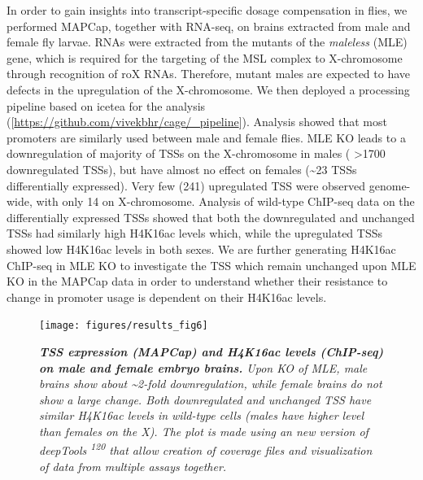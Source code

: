 \documentclass[11pt,twoside]{MPIthesis}
\theoremstyle{definition}
\theoremstyle{definition}
\theoremstyle{definition}
\theoremstyle{remark}
\begin{document}
In order to gain insights into transcript-specific dosage compensation
in flies, we performed MAPCap, together with RNA-seq, on brains
extracted from male and female fly larvae. RNAs were extracted from the
mutants of the \emph{maleless} (MLE) gene, which is required for the
targeting of the MSL complex to X-chromosome through recognition of roX
RNAs. Therefore, mutant males are expected to have defects in the
upregulation of the X-chromosome. We then deployed a processing pipeline
based on icetea for the analysis
({[}{\url{https://github.com/vivekbhr/cage/_pipeline}}{]}). Analysis
showed that most promoters are similarly used between male and female
flies. MLE KO leads to a downregulation of majority of TSSs on the
X-chromosome in males ( \textgreater{}1700 downregulated TSSs), but have
almost no effect on females (\textasciitilde{}23 TSSs differentially
expressed). Very few (241) upregulated TSS were observed genome-wide,
with only 14 on X-chromosome. Analysis of wild-type ChIP-seq data on the
differentially expressed TSSs showed that both the downregulated and
unchanged TSSs had similarly high H4K16ac levels which, while the
upregulated TSSs showed low H4K16ac levels in both sexes. We are further
generating H4K16ac ChIP-seq in MLE KO to investigate the TSS which
remain unchanged upon MLE KO in the MAPCap data in order to understand
whether their resistance to change in promoter usage is dependent on
their H4K16ac levels.

\clearpage
\begin{figure}

{\centering \texttt{[image: figures/results\_fig6]} 

}

\caption[TSS expression (MAPCap) and H4K16ac levels (ChIP-seq) on male and female embryo brains]{\emph{\textbf{TSS expression (MAPCap) and H4K16ac levels
(ChIP-seq) on male and female embryo brains.} Upon KO of MLE, male
brains show about \textasciitilde{}2-fold downregulation, while female
brains do not show a large change. Both downregulated and unchanged TSS
have similar H4K16ac levels in wild-type cells (males have higher level
than females on the X). The plot is made using an new version of
deepTools \textsuperscript{120} that allow creation of coverage files
and visualization of data from multiple assays together.}}\label{fig:unnamed-chunk-11}
\end{figure}
\end{document}
